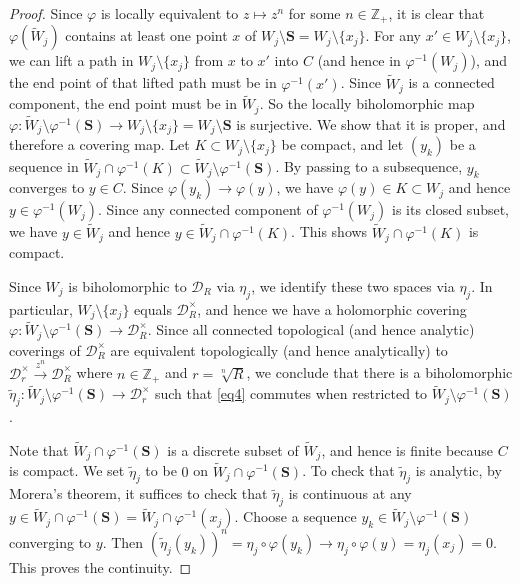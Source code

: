 \documentclass[11pt,b5paper,notitlepage]{article}
\theoremstyle{definition}
\theoremstyle{plain}
\newcommand{\mc}{\mathcal}
\newcommand{\wtd}{\widetilde}
\newcommand{\Zbb}{\mathbb Z}
\newcommand{\Sbf}{\mathbf{S}}
\numberwithin{equation}{subsection}
\begin{document}
\begin{proof}
Since $\varphi$ is locally equivalent to $z\mapsto z^n$ for some $n\in\Zbb_+$, it is clear that $\varphi(\wtd W_j)$ contains at least one point $x$ of $W_j\setminus\Sbf=W_j\setminus\{x_j\}$. For any $x'\in W_j\setminus\{x_j\}$, we can lift a path in $W_j\setminus\{x_j\}$ from $x$ to $x'$ into $C$ (and hence in $\varphi^{-1}(W_j)$), and the end point of that lifted path must be in $\varphi^{-1}(x')$. Since $\wtd W_j$ is a connected component,  the end point must be in $\wtd W_j$. So the locally biholomorphic map $\varphi:\wtd W_j\setminus\varphi^{-1}(\Sbf)\rightarrow W_j\setminus\{x_j\}=W_j\setminus\Sbf$ is surjective. We show that it is proper, and therefore  a covering map. Let $K\subset W_j\setminus\{x_j\}$ be compact, and let $(y_k)$ be a sequence in $\wtd W_j\cap\varphi^{-1}(K)\subset\wtd W_j\setminus\varphi^{-1}(\Sbf)$. By passing to a subsequence, $y_k$ converges to $y\in C$. Since $\varphi(y_k)\rightarrow \varphi(y)$, we have $\varphi(y)\in K\subset W_j$ and hence $y\in\varphi^{-1}(W_j)$. Since any connected component of $\varphi^{-1}(W_j)$ is its closed subset, we have $y\in\wtd W_j$ and hence $y\in\wtd W_j\cap\varphi^{-1}(K)$. This shows $\wtd W_j\cap\varphi^{-1}(K)$ is compact. 

Since $W_j$  is biholomorphic to $\mc D_R$ via $\eta_j$, we identify these two spaces via $\eta_j$. In particular, $W_j\setminus\{x_j\}$ equals $\mc D_R^\times$, and hence we have a holomorphic covering $\varphi:\wtd W_j\setminus\varphi^{-1}(\Sbf)\rightarrow\mc D_R^\times$. Since all connected topological (and hence  analytic) coverings of $\mc D_R^\times$ are equivalent topologically (and hence analytically) to $\mc D_r^\times\xrightarrow{z^n}\mc D_R^\times$ where $n\in\Zbb_+$ and $r=\sqrt[n]{R}$, we conclude that there is a biholomorphic $\wtd\eta_j:\wtd W_j\setminus\varphi^{-1}(\Sbf)\rightarrow\mc D_r^\times$ such that \eqref{eq4} commutes when restricted to $\wtd W_j\setminus\varphi^{-1}(\Sbf)$. 

Note that $\wtd W_j\cap\varphi^{-1}(\Sbf)$ is a discrete  subset of $\wtd W_j$, and hence is finite because $C$ is compact. We set $\wtd\eta_j$ to be $0$ on $\wtd W_j\cap\varphi^{-1}(\Sbf)$. To check that $\wtd\eta_j$ is analytic, by Morera's theorem, it suffices to check that $\wtd\eta_j$ is continuous at any $y\in\wtd W_j\cap\varphi^{-1}(\Sbf)=\wtd W_j\cap\varphi^{-1}(x_j)$. Choose a sequence $y_k\in\wtd W_j\setminus\varphi^{-1}(\Sbf)$ converging to $y$. Then $(\wtd\eta_j(y_k))^n=\eta_j\circ\varphi(y_k)\rightarrow\eta_j\circ\varphi(y)=\eta_j(x_j)=0$. This proves the continuity. 


\end{proof}
\end{document}
